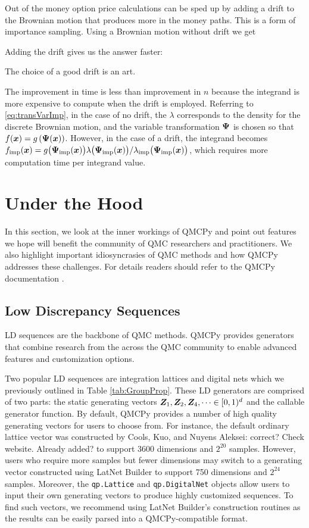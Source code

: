 \documentclass[graybox,footinfo]{svmult}
\newcommand{\AGSComment}[1]{{\color{cyan} Aleksei: #1}}
\newcommand{\IMP}{\textup{imp}}
\begin{document}
Out of the money option price calculations can be sped up by adding a drift to the Brownian motion that produces more in the money paths.  This is a form of importance sampling.  Using a Brownian motion without drift we get

Adding the drift gives us the answer faster:

The choice of a good drift is an art.  

The improvement in time is less than improvement in $n$ because the integrand is more expensive to compute when the drift is employed.  Referring to \eqref{eq:transVarImp}, in the case of no drift, the $\lambda$ corresponds to the density for the discrete Brownian motion, and the variable transformation ${\boldsymbol{\Psi}}$ is chosen so that $f({\boldsymbol{x}}) = g\left({\boldsymbol{\Psi}}({\boldsymbol{x}}) \right)$.  However, in the case of a drift, the integrand becomes  $f_\IMP(\bsx)  = g\bigl(\bsPsi_\IMP(\bsx)\bigr)  \lambda\bigl(\bsPsi_\IMP(\bsx)\bigr)/\lambda_\IMP\bigl(\bsPsi_\IMP(\bsx)\bigr)$, which requires more computation time per integrand value. 

\section{Under the Hood}

In this section, we look at the inner workings of QMCPy and point out features we hope will benefit the community of QMC researchers and practitioners. We also highlight important idiosyncrasies of QMC methods and how QMCPy addresses these challenges. For details readers should refer to the QMCPy documentation \cite{QMCPyDocs}.

\subsection{Low Discrepancy Sequences}

LD sequences are the backbone of QMC methods. QMCPy provides generators that combine research from the across the QMC community to enable advanced features and customization options.

Two popular LD sequences are integration lattices and digital nets which we previously outlined in Table \ref{tab:GroupProp}. These LD generators are comprised of two parts: the static generating vectors ${\boldsymbol{Z}}_1,{\boldsymbol{Z}}_2,{\boldsymbol{Z}}_4, \dots \in [0,1)^d$ and the callable generator function. By default, QMCPy provides a number of high quality generating vectors for users to choose from. For instance, the default ordinary lattice vector was constructed by Cools, Kuo, and Nuyens \cite{doi:10.1137/06065074X} \AGSComment{correct? Check website. Already added?} to support 3600 dimensions and $2^{20}$ samples. However, users who require more samples but fewer dimensions may switch to a generating vector constructed using LatNet Builder \cite{LEcEtal22a,LatNet} to support 750 dimensions and $2^{24}$ samples. Moreover, the \texttt{qp.Lattice} and \texttt{qp.DigitalNet} objects allow users to input their own generating vectors to produce highly customized sequences. To find such vectors, we recommend using LatNet Builder's construction routines as the results can be easily parsed into a QMCPy-compatible format. 
\end{document}
